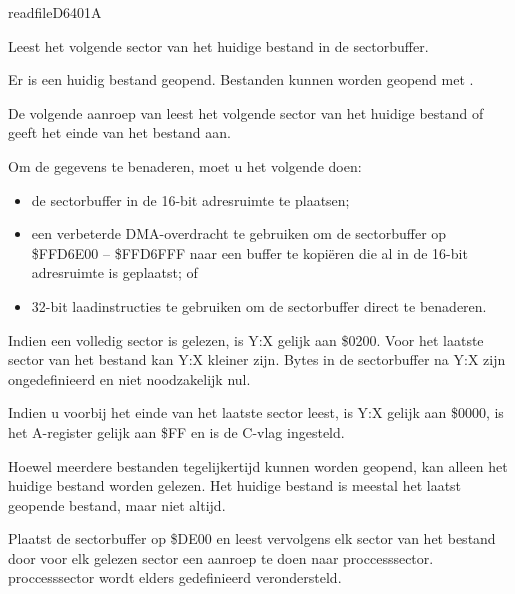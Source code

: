 \newpage
\begin{hyppotrap}{readfile}{D640}{1A}

\item [Dienst:]  Leest het volgende sector van het huidige bestand in de sectorbuffer.
\item [Voorwaarden:]  Er is een huidig bestand geopend. Bestanden kunnen worden geopend met .
\item [Resultaten:]    
\item [Nawerkingen:]  De volgende aanroep van  leest het volgende sector van het huidige  bestand of geeft het einde van het bestand aan.
\item [Foutcodes:]  
\item [Geschiedenis:]
\item [Opmerkingen:]  Om de gegevens te benaderen, moet u het volgende doen:
  \begin{itemize}
    
\item de sectorbuffer in de 16-bit adresruimte te plaatsen;    
\item een verbeterde DMA-overdracht te gebruiken om de sectorbuffer op          \$FFD6E00 -- \$FFD6FFF naar een buffer te kopiëren die al in de 16-bit          adresruimte is geplaatst; of    
\item 32-bit laadinstructies te gebruiken om de sectorbuffer direct te  benaderen.
  \end{itemize}

  Indien een volledig sector is gelezen, is Y:X gelijk aan \$0200. Voor het laatste sector van het  bestand kan Y:X kleiner zijn. Bytes in de sectorbuffer na Y:X zijn  ongedefinieerd en niet noodzakelijk nul.

  Indien u voorbij het einde van het laatste sector leest, is Y:X gelijk aan \$0000, is het  A-register gelijk aan \$FF en is de C-vlag ingesteld.

  Hoewel meerdere bestanden tegelijkertijd kunnen worden geopend, kan alleen het huidige bestand worden  gelezen. Het huidige bestand is meestal het laatst geopende bestand, maar niet altijd.\item [Voorbeeld:]  Plaatst de sectorbuffer op \$DE00 en leest vervolgens elk sector van het bestand  door voor elk gelezen sector een aanroep te doen naar proccesssector. proccesssector wordt elders  gedefinieerd verondersteld.
\end{hyppotrap}


